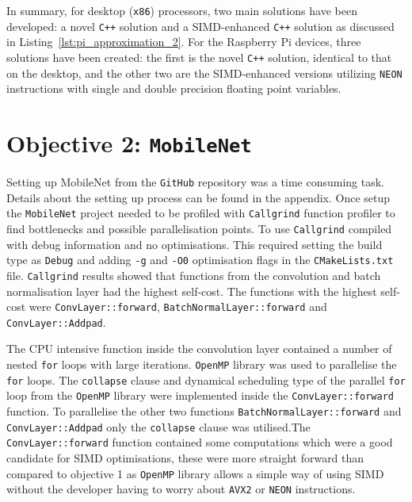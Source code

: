 In summary, for desktop (\texttt{x86}) processors, two main solutions have been developed: a novel \texttt{C++} solution and a SIMD-enhanced \texttt{C++} solution as discussed in Listing~\ref{lst:pi_approximation_2}. For the Raspberry Pi devices, three solutions have been created: the first is the novel \texttt{C++} solution, identical to that on the desktop, and the other two are the SIMD-enhanced versions utilizing \texttt{NEON} instructions with single and double precision floating point variables.

\section{Objective 2: \texttt{MobileNet}}

Setting up MobileNet from the \texttt{GitHub} repository\cite{mobilenet_repo} was a time consuming task. Details about the setting up process can be found in the appendix. Once setup the \texttt{MobileNet} project needed to be profiled with \texttt{Callgrind} function profiler to find bottlenecks and possible parallelisation points. To use \texttt{Callgrind} compiled with debug information and no optimisations. This required setting the build type as \texttt{Debug} and adding \texttt{-g} and \texttt{-O0} optimisation flags in the \texttt{CMakeLists.txt} file. \texttt{Callgrind} results showed that functions from the convolution and batch normalisation layer had the highest self-cost. The functions with the highest self-cost were \texttt{ConvLayer::forward}, \texttt{BatchNormalLayer::forward} and \texttt{ConvLayer::Addpad}.

The CPU intensive function inside the convolution layer contained a number of nested \texttt{for} loops with large iterations. \texttt{OpenMP} library was used to parallelise the \texttt{for} loops. The \texttt{collapse} clause and dynamical scheduling type of the parallel \texttt{for} loop from the \texttt{OpenMP} library were implemented inside the \texttt{ConvLayer::forward} function. To parallelise the other two functions \texttt{BatchNormalLayer::forward} and \texttt{ConvLayer::Addpad} only the \texttt{collapse} clause was utilised.The \texttt{ConvLayer::forward} function contained some computations which were a good candidate for SIMD optimisations, these were more straight forward than compared to objective 1 as \texttt{OpenMP} library allows a simple way of using SIMD without the developer having to worry about \texttt{AVX2} or \texttt{NEON} instructions. 

